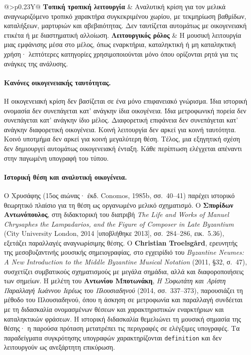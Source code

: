 \documentclass[11pt,a4paper]{article}
\begin{document}
{\begin{xltabular}{\textwidth}{@{}>{\RaggedRight\arraybackslash}p{0.23\textwidth}Y@{}}
\midrule
\textbf{Τοπική τροπική λειτουργία} & Αναλυτική κρίση για τον μελικά αναγνωριζόμενο τροπικό χαρακτήρα συγκεκριμένου χωρίου, με τεκμηρίωση βαθμίδων, καταλήξεων, μαρτυριών και αβεβαιότητας. Δεν ταυτίζεται αυτομάτως με οικογενειακή ετικέτα ή με διαστηματική αλλοίωση.\tabularnewline
\midrule
\textbf{Λειτουργικός ρόλος} & Η μουσική λειτουργία μιας εμφάνισης μέσα στο μέλος, όπως εναρκτήρια, καταληκτική ή μη καταληκτική χρήση· λεπτότερες κατηγορίες χρησιμοποιούνται μόνο όπου ορίζονται ρητά για τις ανάγκες της ανάλυσης.\tabularnewline
\end{xltabular}
}\par

\paragraph{Κανόνες οικογενειακής ταυτότητας.}
Η οικογενειακή κρίση δεν βασίζεται σε ένα μόνο επιφανειακό γνώρισμα. Ίδια ιστορική ονομασία δεν συνεπάγεται κατ' ανάγκην ίδια οικογένεια. Ίδια μετροφωνική πορεία δεν συνεπάγεται κατ' ανάγκην ίδιο μέλος. Διαφορετική επιφάνεια δεν συνεπάγεται κατ' ανάγκην διαφορετική οικογένεια. Κοινή λειτουργία δεν αρκεί για κοινή ταυτότητα. Κοινό υποτμήμα δεν αρκεί για κοινή μεγαλύτερη θέση. Τέλος, μια εξηγητική σχέση δεν δημιουργεί αυτομάτως οικογενειακή ένταξη. Κάθε περίπτωση ελέγχεται απέναντι στην παγωμένη υπογραφή του τύπου.

\paragraph{Ιστορική θέση και αναλυτική οικογένεια.}
Ο Χρυσάφης (15ος αιώνας· έκδ. Conomos, 1985b, σσ.~40--41) παρέχει ιστορικό θεωρητικό πλαίσιο για τη θέση ως οργανωμένο μελικό σχηματισμό. Ο \textbf{Σπυρίδων Αντωνόπουλος}, στη διδακτορική του διατριβή \emph{The Life and Works of Manuel Chrysaphes the Lampadarios, and the Figure of Composer in Late Byzantium} (City University London, 2014 [υποβλήθηκε 2013], σσ.~284--286, εικ.~5.36), εξετάζει παραλλαγές αναγνωρίσιμης θέσης. Ο \textbf{Christian Troelsgård}, ερευνητής της μεσοβυζαντινής μουσικής σημειογραφίας, στο εγχειρίδιό του \emph{Byzantine Neumes: A New Introduction to the Middle Byzantine Musical Notation} (2011, §32, σ.~47), συσχετίζει συμβατικούς σχηματισμούς με μεγάλα σημάδια, αλλά και διαφοροποιήσεις των σημείων. Η μελέτη του \textbf{Αντωνίου Μποτωνάκη}, \emph{Η Σοφωτάτη και Αρίστη Παραλλαγή Ιωάννου Ιερέως του Πλουσιαδηνού} (2014, σσ.~337--373), παρουσιάζει τη μέθοδο του Πλουσιαδηνού, όπου η άσκηση σε μετροφωνία και παραλλαγή συνδέεται με τη διδασκαλία ονομασμένων θέσεων και χαρακτηριστικών εναρκτήριων και καταληκτικών φράσεων. Η ιστορική διδασκαλία θεμελιώνει τη μουσική σημασία της θέσης· η παρούσα πρόταση μετατρέπει τις περιγραφές σε ελέγξιμες υπογραφές. Τα παραδείγματα συγκρότησης υπογραφών χαρακτηρίζονται \texttt{definition} και δεν λειτουργούν ως ανεξάρτητη επικύρωση.
\end{document}
